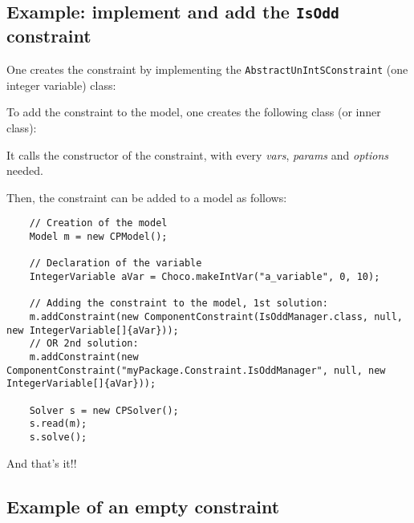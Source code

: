 \subsection{Example: implement and add the \texttt{IsOdd} constraint}
One creates the constraint by implementing the \texttt{AbstractUnIntSConstraint} (one integer variable) class:


To add the constraint to the model, one creates the following class (or inner class):

It calls the constructor of the constraint, with every \emph{vars}, \emph{params} and \emph{options} needed.

Then, the constraint can be added to a model as follows:
\begin{lstlisting}
	// Creation of the model
	Model m = new CPModel();
	
	// Declaration of the variable
	IntegerVariable aVar = Choco.makeIntVar("a_variable", 0, 10);
	
	// Adding the constraint to the model, 1st solution:
	m.addConstraint(new ComponentConstraint(IsOddManager.class, null, new IntegerVariable[]{aVar}));
	// OR 2nd solution:
	m.addConstraint(new ComponentConstraint("myPackage.Constraint.IsOddManager", null, new IntegerVariable[]{aVar}));
	
	Solver s = new CPSolver();
	s.read(m);
	s.solve();
\end{lstlisting}
And that's it!!

\subsection{Example of an empty constraint}\label{advanced:anexempleofemptyconstraint}\hypertarget{advanced:anexempleofemptyconstraint}{}


